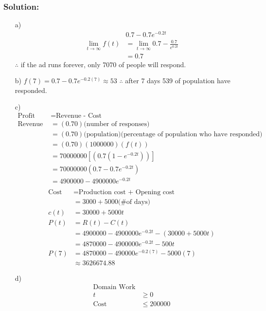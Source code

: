 \documentclass{article}
\begin{document}
\subsubsection*{Solution: }
\begin{enumerate}
    \item[a)] 
    \begin{align*}
        &0.7-0.7e^{-0.2t}\\
        \lim_{t\to \infty}f(t) &=\lim_{t\to \infty}0.7-\frac{0.7}{e^{0.2t}}\\
        &=0.7
    \end{align*}
$\therefore$ if the ad runs forever, only 7070 of people will respond. 
    \item[b)] $f(7)=0.7-0.7e^{-0.2(7)}\approx 53$
    $\therefore$ after 7 days 539 of population have responded.
    \item[c)] 
    \begin{align*}
    \text{Profit } &= \text{Revenue - Cost}\\    
    \text{Revenue }&=(0.70)\text{(number of responses)}\\
    &=(0.70)\text{(population)(percentage of population who have responded)} \\
    &=(0.70)(1000000)(f(t))\\
    &=70000000\left[(0.7(1-e^{-0.2t}))\right]\\
    &=70000000(0.7-0.7e^{-0.2t})\\
    &=4900000-4900000e^{-0.2t}\\
    \end{align*}
    \begin{align*}
    \text{Cost} &= \text{Production cost + Opening cost}\\
    &=3000+5000\text{(\# of days)}\\
    c(t)&=30000+5000t\\
    P(t)&=R(t)-C(t)\\
    &=4900000-4900000e^{-0.2t}-(30000+5000t)\\
    &=4870000-4900000e^{-0.2t}-500t\\
    P(7)&=4870000-490000e^{-0.2(7)}-5000(7)\\
    &\approx 3626674.88
    \end{align*}
    \item[d)] 
    \begin{align*}
        \text{Domain Work}\\
        t &\geq 0\\
        \text{Cost} &\leq 200000\\

\end{align*}
\end{enumerate}
\end{document}
